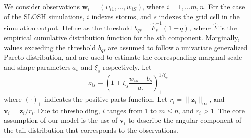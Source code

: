 We consider observations $\bm{w}_{i} = (w_{i1}, \ldots , w_{iS})$, where 
    $i =1 ,\ldots m ,n$. For the case of the SLOSH simulations, $i$ indexes 
    storms, and $s$ indexes the grid cell in the simulation output.
    Define as the threshold $b_{qs} = \hat{F}_{s}^{-1}(1 - q)$, where $\hat{F}$ is
    the empirical cumulative distribution function for the $s$th component.
    Marginally, values exceeding the threshold $b_{qs}$ are assumed to follow
    a univariate generalized Pareto distribution, and are used to estimate the
    corresponding marginal scale and shape parameters $a_{s}$ and $\xi_{s}$
    respectively.  Let
    \begin{equation}
        \label{eqn:standardization}
        z_{is} = \left(1 + \xi_{s}\frac{w_{is} 
            - b_{s}}{a_{s}}\right)_{+}^{1 / \xi_{s}}
    \end{equation}
    where $(\cdot)_+$ indicates the positive parts function.  Let 
    $r_i = \lVert \bm{z}_i\rVert_{\infty}$, and $\bm{v}_i = \bm{z}_i / r_i$.  Due to 
    thresholding, $i$ ranges from 1 to $m\leq n$, and $r_i > 1$.  The core 
    assumption of our model is the use of $\bm{v}_i$ to describe the 
    angular component of the tail distribution that corresponds to the
    observations.

